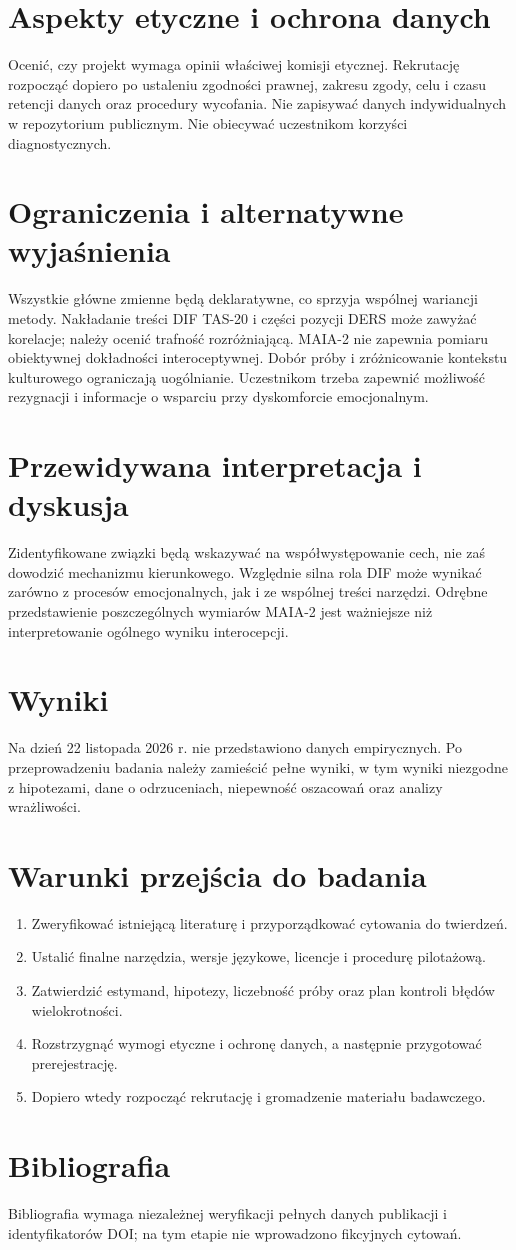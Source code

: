 \documentclass[11pt,a4paper]{article}
\begin{document}
\section{Aspekty etyczne i ochrona danych}
Ocenić, czy projekt wymaga opinii właściwej komisji etycznej. Rekrutację rozpocząć dopiero po ustaleniu zgodności prawnej, zakresu zgody, celu i czasu retencji danych oraz procedury wycofania. Nie zapisywać danych indywidualnych w repozytorium publicznym. Nie obiecywać uczestnikom korzyści diagnostycznych.
\section{Ograniczenia i alternatywne wyjaśnienia}
Wszystkie główne zmienne będą deklaratywne, co sprzyja wspólnej wariancji metody. Nakładanie treści DIF TAS-20 i części pozycji DERS może zawyżać korelacje; należy ocenić trafność rozróżniającą. MAIA-2 nie zapewnia pomiaru obiektywnej dokładności interoceptywnej. Dobór próby i zróżnicowanie kontekstu kulturowego ograniczają uogólnianie. Uczestnikom trzeba zapewnić możliwość rezygnacji i informacje o wsparciu przy dyskomforcie emocjonalnym.
\section{Przewidywana interpretacja i dyskusja}
Zidentyfikowane związki będą wskazywać na współwystępowanie cech, nie zaś dowodzić mechanizmu kierunkowego. Względnie silna rola DIF może wynikać zarówno z procesów emocjonalnych, jak i ze wspólnej treści narzędzi. Odrębne przedstawienie poszczególnych wymiarów MAIA-2 jest ważniejsze niż interpretowanie ogólnego wyniku interocepcji.
\section{Wyniki}
Na dzień 22 listopada 2026 r. nie przedstawiono danych empirycznych. Po przeprowadzeniu badania należy zamieścić pełne wyniki, w tym wyniki niezgodne z hipotezami, dane o odrzuceniach, niepewność oszacowań oraz analizy wrażliwości.
\section{Warunki przejścia do badania}
\begin{enumerate}
\item Zweryfikować istniejącą literaturę i przyporządkować cytowania do twierdzeń.
\item Ustalić finalne narzędzia, wersje językowe, licencje i procedurę pilotażową.
\item Zatwierdzić estymand, hipotezy, liczebność próby oraz plan kontroli błędów wielokrotności.
\item Rozstrzygnąć wymogi etyczne i ochronę danych, a następnie przygotować prerejestrację.
\item Dopiero wtedy rozpocząć rekrutację i gromadzenie materiału badawczego.
\end{enumerate}
\section*{Bibliografia}
Bibliografia wymaga niezależnej weryfikacji pełnych danych publikacji i identyfikatorów DOI; na tym etapie nie wprowadzono fikcyjnych cytowań.
\end{document}
